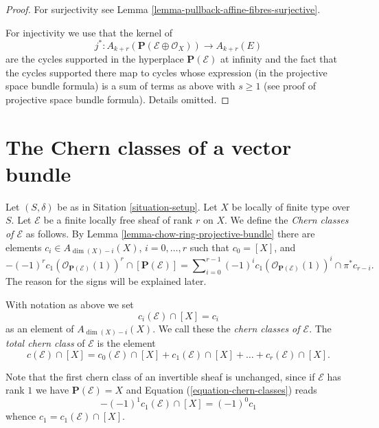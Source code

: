 \begin{proof}
For surjectivity see Lemma \ref{lemma-pullback-affine-fibres-surjective}.

\medskip\noindent
For injectivity we use that the kernel of
$$
j^* :
A_{k + r}(\mathbf{P}(\mathcal{E} \oplus \mathcal{O}_X))
\longrightarrow
A_{k + r}(E)
$$
are the cycles supported in the hyperplace $\mathbf{P}(\mathcal{E})$
at infinity and the fact that the cycles supported there map to cycles
whose expression (in the projective space bundle formula) is a sum of
terms as above with $s \geq 1$ (see proof of projective space bundle
formula). Details omitted.
\end{proof}








\section{The Chern classes of a vector bundle}
\label{section-chern-classes-vector-bundles}

\noindent
Let $(S, \delta)$ be as in Sitation \ref{situation-setup}.
Let $X$ be locally of finite type over $S$.
Let $\mathcal{E}$ be a finite locally free sheaf of rank $r$ on $X$.
We define the {\it Chern classes of $\mathcal{E}$}
as follows. By Lemma \ref{lemma-chow-ring-projective-bundle} there are
elements $c_i \in A_{\dim(X) - i}(X)$, $i=0, \ldots, r$
such that $c_0 = [X]$, and
\begin{equation}
\label{equation-chern-classes}
-(-1)^r c_1(\mathcal{O}_{\mathbf{P}(\mathcal{E})}(1))^r \cap
[\mathbf{P}(\mathcal{E})]
=
\sum\nolimits_{i = 0}^{r - 1}
(-1)^i c_1(\mathcal{O}_{\mathbf{P}(\mathcal{E})}(1))^i \cap \pi^*c_{r - i}.
\end{equation}
The reason for the signs will be explained later.

\begin{definition}
\label{definition-chern-classes}
With notation as above we set
$$
c_i(\mathcal{E}) \cap [X] = c_i
$$
as an element of $A_{\dim(X) - i}(X)$.
We call these the {\it chern classes of $\mathcal{E}$}.
The {\it total chern class} of 
${\mathcal E}$ is the element
$$
c({\mathcal E}) \cap [X] = 
c_0({\mathcal E}) \cap [X] + c_1({\mathcal E}) \cap [X] + \ldots
+ c_r({\mathcal E}) \cap [X].
$$
\end{definition}

\noindent
Note that the first chern class of an invertible
sheaf is unchanged, since if $\mathcal{E}$ has rank $1$ we have
$\mathbf{P}(\mathcal{E}) = X$ and Equation (\ref{equation-chern-classes})
reads
$$
-(-1)^1 c_1(\mathcal{E}) \cap [X] = (-1)^0 c_1
$$
whence $c_1 = c_1(\mathcal{E}) \cap [X]$.




